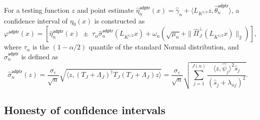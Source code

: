\documentclass[11pt,a4paper]{article}
\renewcommand{\hat}{\widehat}
\theoremstyle{definition}
\theoremstyle{plain}
\theoremstyle{remark}
\newcommand{\adptr}{\mathsf{adptr}}
\begin{document}
For a testing function $z$ and point estimate $\hat\eta_n^\adptr(x)=\hat\gamma_n+\langle L_{K^{1/2}}z,\hat\theta_n^\adptr\rangle$, a confidence interval of $\eta_0(x)$ is constructed as
$$
\varphi^\adptr(x) = [\hat\eta_n^\adptr(x)\;\pm\;\tau_{\alpha}\hat\sigma_n^\adptr(L_{K^{1/2}}x)+\omega_n(\sqrt{\mu_n}+\|\hat\Pi_J^\perp(L_{K^{1/2}}x)\|_2)],
$$
where $\tau_{\alpha}$ is the $(1-\alpha/2)$ quantile of the standard Normal distribution, and $\hat\sigma_n^\adptr$ is defined as
$$
\hat\sigma_n^\adptr(z) =  \frac{\sigma_\varepsilon}{\sqrt{n}}\sqrt{\langle z, (T_J+\Lambda_J)^\dagger T_J(T_J+\Lambda_J)z\rangle} = \frac{\sigma_\varepsilon}{\sqrt{n}}\sqrt{\sum_{j=1}^{J(n)}\frac{\langle z,\hat\psi_j\rangle^2\hat s_j}{(\hat s_j+\lambda_{nj})^2}}.
$$

\subsection{Honesty of confidence intervals}
\end{document}
